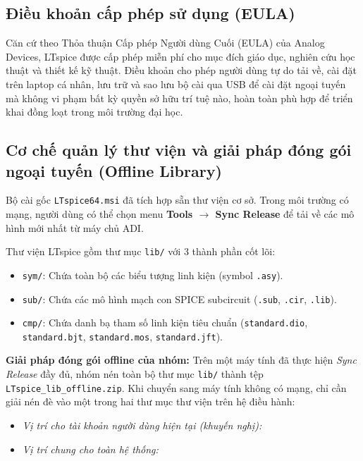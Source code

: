 \documentclass[12pt,a4paper]{article}
\begin{document}
\subsection{Điều khoản cấp phép sử dụng (EULA)}
Căn cứ theo Thỏa thuận Cấp phép Người dùng Cuối (EULA) của Analog Devices, LTspice được cấp phép miễn phí cho mục đích giáo dục, nghiên cứu học thuật và thiết kế kỹ thuật. Điều khoản cho phép người dùng tự do tải về, cài đặt trên laptop cá nhân, lưu trữ và sao lưu bộ cài qua USB để cài đặt ngoại tuyến mà không vi phạm bất kỳ quyền sở hữu trí tuệ nào, hoàn toàn phù hợp để triển khai đồng loạt trong môi trường đại học.

\subsection{Cơ chế quản lý thư viện và giải pháp đóng gói ngoại tuyến (Offline Library)}
Bộ cài gốc \texttt{LTspice64.msi} đã tích hợp sẵn thư viện cơ sở. Trong môi trường có mạng, người dùng có thể chọn menu \textbf{Tools $\rightarrow$ Sync Release} để tải về các mô hình mới nhất từ máy chủ ADI.

Thư viện LTspice gồm thư mục \texttt{lib/} với 3 thành phần cốt lõi:
\begin{itemize}[itemsep=2pt]
  \item \texttt{sym/}: Chứa toàn bộ các biểu tượng linh kiện (symbol \texttt{.asy}).
  \item \texttt{sub/}: Chứa các mô hình mạch con SPICE subcircuit (\texttt{.sub}, \texttt{.cir}, \texttt{.lib}).
  \item \texttt{cmp/}: Chứa danh bạ tham số linh kiện tiêu chuẩn (\texttt{standard.dio}, \texttt{standard.bjt}, \texttt{standard.mos}, \texttt{standard.jft}).
\end{itemize}

\textbf{Giải pháp đóng gói offline của nhóm:}
Trên một máy tính đã thực hiện \textit{Sync Release} đầy đủ, nhóm nén toàn bộ thư mục \texttt{lib/} thành tệp \texttt{LTspice\_lib\_offline.zip}. Khi chuyển sang máy tính không có mạng, chỉ cần giải nén đè vào một trong hai thư mục thư viện trên hệ điều hành:
\begin{itemize}[itemsep=1pt]
  \item \textit{Vị trí cho tài khoản người dùng hiện tại (khuyến nghị):}\newline
  \item \textit{Vị trí chung cho toàn hệ thống:}\newline
\end{itemize}
\end{document}
